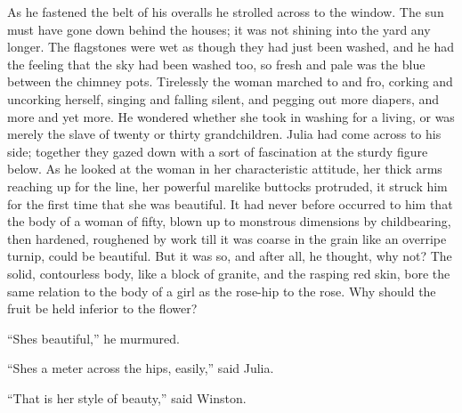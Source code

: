 As he fastened the belt of his overalls he strolled across to the
window. The sun must have gone down behind the houses; it was not
shining into the yard any longer. The flagstones were wet as though they
had just been washed, and he had the feeling that the sky had been
washed too, so fresh and pale was the blue between the chimney pots.
Tirelessly the woman marched to and fro, corking and uncorking herself,
singing and falling silent, and pegging out more diapers, and more and
yet more. He wondered whether she took in washing for a living, or was
merely the slave of twenty or thirty grandchildren. Julia had come
across to his side; together they gazed down with a sort of fascination
at the sturdy figure below. As he looked at the woman in her
characteristic attitude, her thick arms reaching up for the line, her
powerful marelike buttocks protruded, it struck him for the first time
that she was beautiful. It had never before occurred to him that the
body of a woman of fifty, blown up to monstrous dimensions by
childbearing, then hardened, roughened by work till it was coarse in the
grain like an overripe turnip, could be beautiful. But it was so, and
after all, he thought, why not? The solid, contourless body, like a
block of granite, and the rasping red skin, bore the same relation to
the body of a girl as the rose-hip to the rose. Why should the fruit be
held inferior to the flower?

``She\textquotesingle s beautiful,'' he murmured.

``She\textquotesingle s a meter across the hips, easily,'' said Julia.

``That is her style of beauty,'' said Winston.

